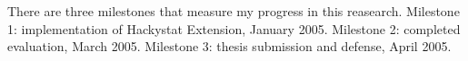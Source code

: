 

There are three milestones that measure my progress in this reasearch.
Milestone 1: implementation of Hackystat Extension, January 2005.
Milestone 2: completed evaluation, March 2005. Milestone 3: thesis
submission and defense, April 2005.

